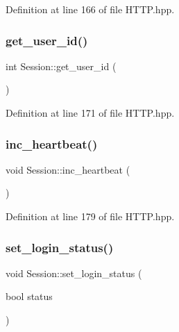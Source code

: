 Definition at line 166 of file H\+T\+T\+P.\+hpp.

\mbox{\label{class_session_a27ff9bf22983a7f3a11404afc8ca75b0}} 
\subsubsection{\texorpdfstring{get\+\_\+user\+\_\+id()}{get\_user\_id()}}
{\footnotesize\ttfamily int Session\+::get\+\_\+user\+\_\+id (\begin{DoxyParamCaption}{ }\end{DoxyParamCaption})}



Definition at line 171 of file H\+T\+T\+P.\+hpp.

\mbox{\label{class_session_ac17618c5aa9d130bf6d44013b4796577}} 
\subsubsection{\texorpdfstring{inc\+\_\+heartbeat()}{inc\_heartbeat()}}
{\footnotesize\ttfamily void Session\+::inc\+\_\+heartbeat (\begin{DoxyParamCaption}{ }\end{DoxyParamCaption})}



Definition at line 179 of file H\+T\+T\+P.\+hpp.

\mbox{\label{class_session_a489d5cc0b4c6a91818b4292253f5c379}} 
\subsubsection{\texorpdfstring{set\+\_\+login\+\_\+status()}{set\_login\_status()}}
{\footnotesize\ttfamily void Session\+::set\+\_\+login\+\_\+status (\begin{DoxyParamCaption}\item[{bool}]{status }\end{DoxyParamCaption})}



